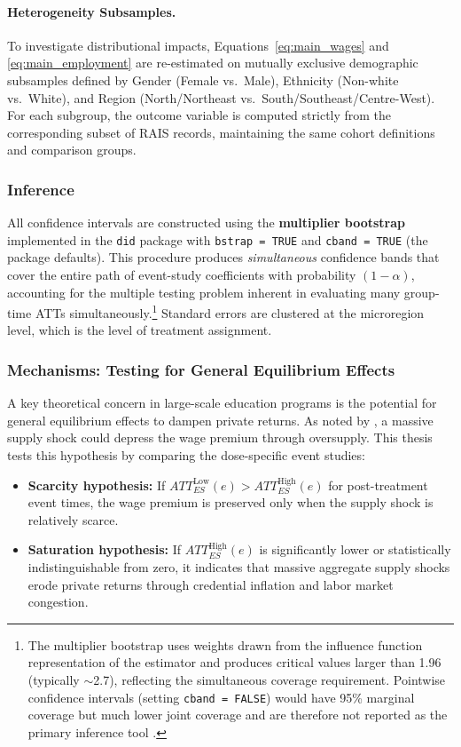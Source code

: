 \paragraph{Heterogeneity Subsamples.}
To investigate distributional impacts, Equations~\ref{eq:main_wages} and \ref{eq:main_employment} are re-estimated on mutually exclusive demographic subsamples defined by Gender (Female vs.\ Male), Ethnicity (Non-white vs.\ White), and Region (North/Northeast vs.\ South/Southeast/Centre-West). For each subgroup, the outcome variable is computed strictly from the corresponding subset of RAIS records, maintaining the same cohort definitions and comparison groups.


\subsubsection{Inference}
\label{sec:inference}

All confidence intervals are constructed using the \textbf{multiplier bootstrap} implemented in the \texttt{did} package with \texttt{bstrap = TRUE} and \texttt{cband = TRUE} (the package defaults). This procedure produces \emph{simultaneous} confidence bands that cover the entire path of event-study coefficients with probability $(1 - \alpha)$, accounting for the multiple testing problem inherent in evaluating many group-time ATTs simultaneously.\footnote{The multiplier bootstrap uses weights drawn from the influence function representation of the estimator and produces critical values larger than 1.96 (typically $\sim$2.7), reflecting the simultaneous coverage requirement. Pointwise confidence intervals (setting \texttt{cband = FALSE}) would have 95\% marginal coverage but much lower joint coverage and are therefore not reported as the primary inference tool \cite{CallawaySantAnna2021}.} Standard errors are clustered at the microregion level, which is the level of treatment assignment.


\subsubsection{Mechanisms: Testing for General Equilibrium Effects}
\label{sec:mechanisms}

A key theoretical concern in large-scale education programs is the potential for general equilibrium effects to dampen private returns. As noted by , a massive supply shock could depress the wage premium through oversupply. This thesis tests this hypothesis by comparing the dose-specific event studies:
\begin{itemize}
    \item \textbf{Scarcity hypothesis:} If $ATT_{ES}^{\text{Low}}(e) > ATT_{ES}^{\text{High}}(e)$ for post-treatment event times, the wage premium is preserved only when the supply shock is relatively scarce.
    \item \textbf{Saturation hypothesis:} If $ATT_{ES}^{\text{High}}(e)$ is significantly lower or statistically indistinguishable from zero, it indicates that massive aggregate supply shocks erode private returns through credential inflation and labor market congestion.
\end{itemize}

